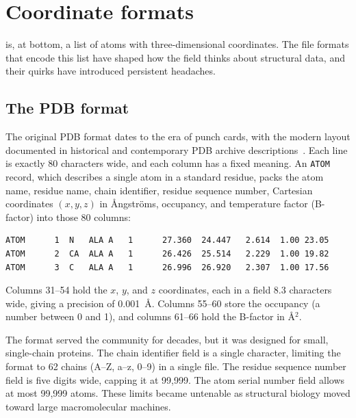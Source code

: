 \section{Coordinate formats}
\label{sec:coord-formats}

 is, at bottom, a list of atoms with
three-dimensional coordinates. The file formats that encode this list have
shaped how the field thinks about structural data, and their quirks have
introduced persistent headaches.

\subsection{The PDB format}
\label{sec:pdb-format}

The original PDB format dates to the era of punch cards, with the modern
layout documented in historical and contemporary PDB archive
descriptions~\cite{bernstein1977,berman2000}. Each line is
exactly 80 characters wide, and each column has a fixed meaning. An
\texttt{ATOM} record, which describes a single atom in a standard residue,
packs the atom name, residue name, chain identifier, residue sequence number,
Cartesian coordinates $(x, y, z)$ in {\AA}ngstr\"oms, occupancy, and
temperature factor (B-factor) into those 80 columns:

\begin{verbatim}
ATOM      1  N   ALA A   1      27.360  24.447   2.614  1.00 23.05
ATOM      2  CA  ALA A   1      26.426  25.514   2.229  1.00 19.82
ATOM      3  C   ALA A   1      26.996  26.920   2.307  1.00 17.56
\end{verbatim}

Columns 31--54 hold the $x$, $y$, and $z$ coordinates, each in a field
8.3 characters wide, giving a precision of 0.001~{\AA}. Columns 55--60 store
the occupancy (a number between 0 and 1), and columns 61--66 hold the
B-factor in {\AA}$^2$.

The format served the community for decades, but it was designed for small,
single-chain proteins. The chain identifier field is a single character,
limiting the format to 62 chains (A--Z, a--z, 0--9) in a single file. The
residue sequence number field is five digits wide, capping it at 99{,}999.
The atom serial number field allows at most 99{,}999 atoms. These limits
became untenable as structural biology moved toward large macromolecular
machines.


